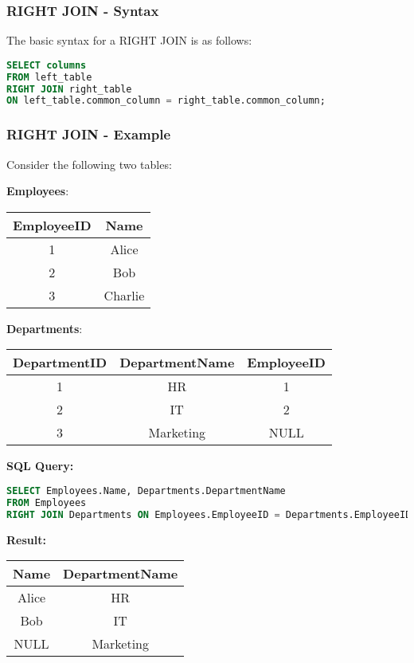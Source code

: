 \documentclass[aspectratio=169]{beamer}
\begin{document}
\begin{frame}[fragile]
    \frametitle{RIGHT JOIN - Syntax}
    The basic syntax for a RIGHT JOIN is as follows:
    \begin{lstlisting}[language=SQL]
SELECT columns
FROM left_table
RIGHT JOIN right_table
ON left_table.common_column = right_table.common_column;
    \end{lstlisting}
\end{frame}

\begin{frame}[fragile]
    \frametitle{RIGHT JOIN - Example}
    Consider the following two tables:
    
    \textbf{Employees}:
    \begin{tabular}{|c|c|}
        \hline
        EmployeeID & Name \\
        \hline
        1 & Alice \\
        2 & Bob \\
        3 & Charlie \\
        \hline
    \end{tabular}
    
    \textbf{Departments}:
    \begin{tabular}{|c|c|c|}
        \hline
        DepartmentID & DepartmentName & EmployeeID \\
        \hline
        1 & HR & 1 \\
        2 & IT & 2 \\
        3 & Marketing & NULL \\
        \hline
    \end{tabular}
    
    \textbf{SQL Query:}
    \begin{lstlisting}[language=SQL]
SELECT Employees.Name, Departments.DepartmentName
FROM Employees
RIGHT JOIN Departments ON Employees.EmployeeID = Departments.EmployeeID;
    \end{lstlisting}
    
    \textbf{Result:}
    \begin{tabular}{|c|c|}
        \hline
        Name & DepartmentName \\
        \hline
        Alice & HR \\
        Bob & IT \\
        NULL & Marketing \\
        \hline
    \end{tabular}
\end{frame}
\end{document}
